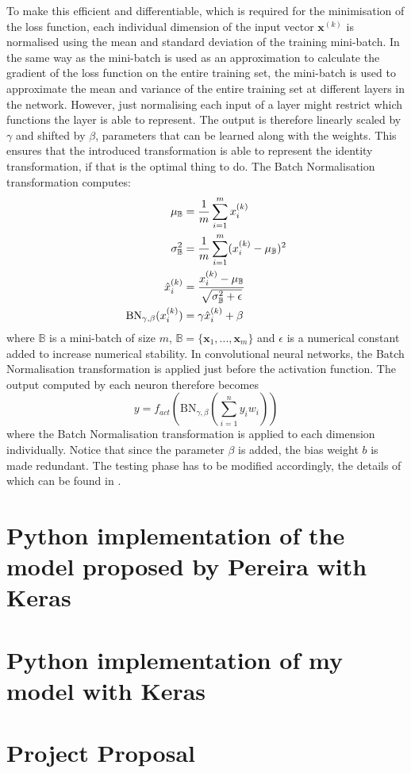 \documentclass[12pt,a4paper,twoside,openright]{report}
\begin{document}
To make this efficient and differentiable, which is required for the minimisation of the loss function, each individual dimension of the input vector $\textbf{x}^{(k)}$ is normalised using the mean and standard deviation of the training mini-batch. In the same way as the mini-batch is used as an approximation to calculate the gradient of the loss function on the entire training set, the mini-batch is used to approximate the mean and variance of the entire training set at different layers in the network. However, just normalising each input of a layer might restrict which functions the layer is able to represent. The output is therefore linearly scaled by $\gamma$ and shifted by $\beta$, parameters that can be learned along with the weights. This ensures that the introduced transformation is able to represent the identity transformation, if that is the optimal thing to do. The Batch Normalisation transformation computes:
\begin{equation}
\begin{split}
	\mu_{\mathbb{B}}  & = \frac{1}{m}\sum_{i=1}^m x^{(k)}_i \\	
	\sigma^2_{\mathbb{B}}  & = \frac{1}{m}\sum_{i=1}^m (x^{(k)}_i - \mu_{\mathbb{B}})^2 \\	
	\hat{x}^{(k)}_i & = \cfrac{x^{(k)}_i - \mu_{\mathbb{B}}}{\sqrt{\sigma^2_{\mathbb{B}} + \epsilon}} \\
	\textrm{BN}_{\gamma, \beta}(x^{(k)}_i) & = \gamma \hat{x}^{(k)}_i + \beta
\end{split}
\end{equation}
where $\mathbb{B}$ is a mini-batch of size $m$, $\mathbb{B} = \{ \textbf{x}_1, ... , \textbf{x}_m \}$ and $\epsilon$ is a numerical constant added to increase numerical stability.
In convolutional neural networks, the Batch Normalisation transformation is applied just before the activation function. The output computed by each neuron therefore becomes
\begin{equation}
		y = f_{act}(\textrm{BN}_{\gamma, \beta}(\sum_{i=1}^{n} y_i w_i))
\end{equation}
where the Batch Normalisation transformation is applied to each dimension individually. Notice that since the parameter $\beta$ is added, the bias weight $b$ is made redundant. The testing phase has to be modified accordingly, the details of which can be found in \cite{batch_normalization}.

\chapter[Implementation of the model proposed by Pereira]{Python implementation of the model proposed by Pereira with Keras}
\label{appendix:pereira_model}



\chapter{Python implementation of my model with Keras}
\label{appendix:my_model}


\chapter{Project Proposal}


\end{document}
